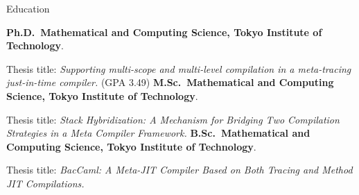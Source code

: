 \begin{rubric}{Education}

\entry*[2020-2023]%
\textbf{Ph.D.~Mathematical and Computing Science, Tokyo Institute of Technology}.\par
Thesis title: \textit{Supporting multi-scope and multi-level compilation in a meta-tracing just-in-time compiler.}
(GPA 3.49)
%
\entry*[2018-2020]%
\textbf{M.Sc.~Mathematical and Computing Science, Tokyo Institute of Technology}.\par
Thesis title: \textit{Stack Hybridization: A Mechanism for Bridging Two Compilation Strategies in a Meta Compiler Framework.}
\entry*[2014-2018]%
\textbf{B.Sc.~Mathematical and Computing Science, Tokyo Institute of Technology}.\par
Thesis title: \textit{BacCaml: A Meta-JIT Compiler Based on Both Tracing and Method JIT Compilations.}
\end{rubric}
